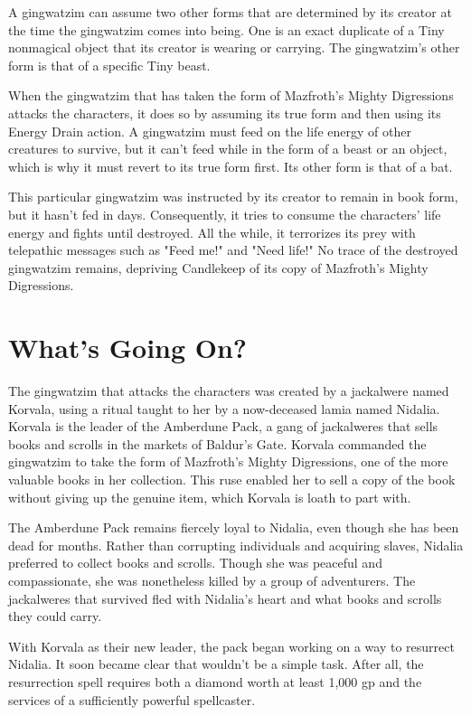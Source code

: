 \documentclass[10pt,a4paper,twoside,bg=print,twocolumn,openany,nodeprecatedcode]{dndbook}
\begin{document}
A gingwatzim can assume two other forms that are determined by its creator at the time the gingwatzim comes into being. One is an exact duplicate of a Tiny nonmagical object that its creator is wearing or carrying. The gingwatzim's other form is that of a specific Tiny beast.

When the gingwatzim that has taken the form of Mazfroth's Mighty Digressions attacks the characters, it does so by assuming its true form and then using its Energy Drain action. A gingwatzim must feed on the life energy of other creatures to survive, but it can't feed while in the form of a beast or an object, which is why it must revert to its true form first. Its other form is that of a bat.

This particular gingwatzim was instructed by its creator to remain in book form, but it hasn't fed in days. Consequently, it tries to consume the characters' life energy and fights until destroyed. All the while, it terrorizes its prey with telepathic messages such as "Feed me!" and "Need life!" No trace of the destroyed gingwatzim remains, depriving Candlekeep of its copy of Mazfroth's Mighty Digressions.

\section{What's Going On?}
The gingwatzim that attacks the characters was created by a jackalwere named Korvala, using a ritual taught to her by a now-deceased lamia named Nidalia. Korvala is the leader of the Amberdune Pack, a gang of jackalweres that sells books and scrolls in the markets of Baldur's Gate. Korvala commanded the gingwatzim to take the form of Mazfroth's Mighty Digressions, one of the more valuable books in her collection. This ruse enabled her to sell a copy of the book without giving up the genuine item, which Korvala is loath to part with.

The Amberdune Pack remains fiercely loyal to Nidalia, even though she has been dead for months. Rather than corrupting individuals and acquiring slaves, Nidalia preferred to collect books and scrolls. Though she was peaceful and compassionate, she was nonetheless killed by a group of adventurers. The jackalweres that survived fled with Nidalia's heart and what books and scrolls they could carry.

With Korvala as their new leader, the pack began working on a way to resurrect Nidalia. It soon became clear that wouldn't be a simple task. After all, the resurrection spell requires both a diamond worth at least 1,000 gp and the services of a sufficiently powerful spellcaster.
\end{document}
